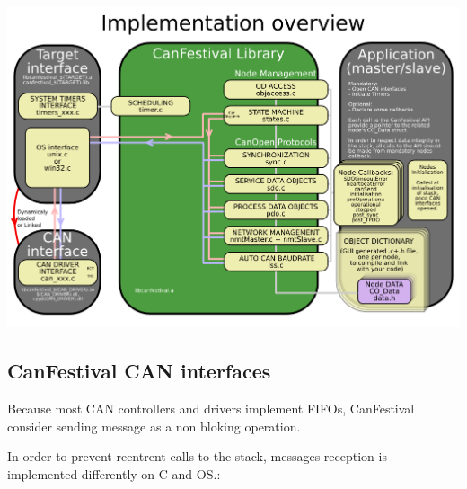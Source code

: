 \documentclass[12pt,twoside]{article}
\begin{document}
 \begin{center}
   \includegraphics[width=20cm]{Pictures/10000201000003F9000002CF880931E7.png}
\end{center}

\bigskip

\subsection{CanFestival CAN interfaces}
Because most CAN controllers and drivers implement FIFOs, CanFestival
consider sending message as a non bloking operation.

In order to prevent reentrent calls to the stack, messages reception is
implemented differently on {\textmu}C and OS.:
\end{document}
